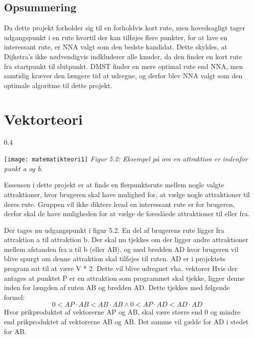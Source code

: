 \subsection{Opsummering}
Da dette projekt forholder sig til en forholdvis kort rute, men hovedsagligt tager udgangspunkt i en rute hvortil der kan tilføjes flere punkter, for at lave en interessant rute, er NNA valgt som den bedste kandidat. Dette skyldes, at Dijkstra’s ikke nødvendigvis indkluderer alle knuder, da den finder en kort rute fra startpunkt til slutpunkt. DMST finder en mere optimal rute end NNA, men samtidig kræver den længere tid at udregne, og derfor blev NNA valgt som den optimale algoritme til dette projekt.

\section{Vektorteori}

\begin{wrapfigure}{}{0.4\textwidth}
	\vspace{-10pt}
	\begin{center}
		\texttt{[image: matematikteori1]} \newline
		\textit{Figur 5.2: Eksempel på om en attraktion er indenfor punkt a og b.}\newline
	\end{center}
	\vspace{-40pt}
\end{wrapfigure}

Essensen i dette projekt er at finde en flerpunktsrute mellem nogle valgte attraktioner, hvor brugeren skal have mulighed for, at vælge nogle attraktioner til deres rute. Gruppen vil ikke diktere hvad en interessant rute er for brugeren, derfor skal de have muligheden for at vælge de foreslåede attraktioner til eller fra.

Der tages nu udgangspunkt i figur 5.2. En del af brugerens rute ligger fra attraktion a til attraktion b. Der skal nu tjekkes om der ligger andre attraktioner mellem afstanden fra a til b (eller AB), og med bredden AD hvor brugeren vil blive spurgt om denne attraktion skal tilføjes til ruten. AD er i projektets program sat til at være V * 2. Dette vil blive udregnet vha. vektorer 
Hvis der antages at punktet P er en attraktion som programmet skal tjekke, ligger denne inden for længden af ruten AB og bredden AD. Dette tjekkes med følgende formel:
\[0 < AP \cdot AB < AB \cdot AB \wedge 0 < AP \cdot AD < AD \cdot AD \]
Hvor prikproduktet af vektorerne AP og AB, skal være større end 0 og mindre end prikproduktet af vektorerne AB og AB. Det samme vil gælde for AD i stedet for AB.

